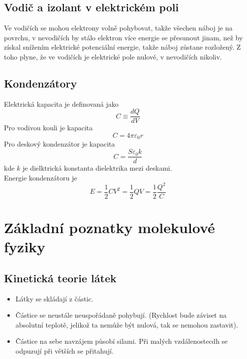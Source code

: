 \documentclass[titlepage]{report}
\begin{document}
\section{Vodič a izolant v elektrickém poli}
Ve vodičích se mohou elektrony volně pohybovat, takže všechen náboj je na povrchu, v nevodičích by stálo elektron více energie se přesunout jinam, než by získal snížením elektrické potenciální energie, takže náboj zůstane rozložený. Z toho plyne, že ve vodičích je elektrické pole nulové, v nevodičích nikoliv.
\section{Kondenzátory}
Elektrická kapacita je definovaná jako\\
\begin{equation}
C \equiv \frac{dQ}{dV}
\end{equation}
Pro vodivou kouli je kapacita\\
\begin{equation}
C = 4\pi \varepsilon_0 r
\end{equation}
Pro deskový kondenzátor je kapacita\\
\begin{equation}
C = \frac{S\varepsilon_0 k}{d}
\end{equation}
kde $k$ je dielktrická konstanta dielektrika mezi deskami.\\
Energie kondenzátoru je\\
\begin{equation}
E = \frac{1}{2}CV^2 = \frac{1}{2}QV  = \frac{1}{2}\frac{Q^2}{C}
\end{equation}
\chapter{Základní poznatky molekulové fyziky}
\section{Kinetická teorie látek}
\begin{itemize}
\item Látky se skládají z částic.
\item Částice se neustále neuspořádaně pohybují. (Rychlost bude záviset na absolutní teplotě, jelikož ta nemůže být nulová, tak se nemohou zastavit).
\item Částice na sebe navzájem působí silami. Při malých vzdálenostecdh se odpuzují při větších se přitahují.
\end{itemize}
\end{document}
